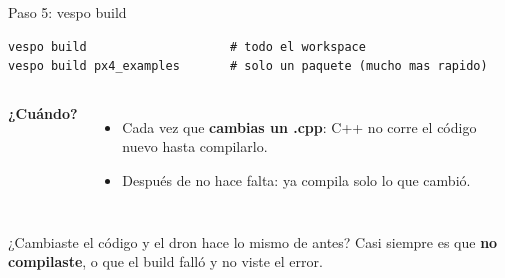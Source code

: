 \begin{frame}[fragile]{Paso 5: vespo build}
  \begin{lstlisting}[style=bash]
vespo build                    # todo el workspace
vespo build px4_examples       # solo un paquete (mucho mas rapido)
  \end{lstlisting}
  \begin{columns}[c]
    \centering
    \small
    \textbf{¿Cuándo?}
    \begin{itemize}
      \item Cada vez que \textbf{cambias un .cpp}: C++ no corre el código nuevo hasta compilarlo.
      \item Después de  no hace falta: ya compila solo lo que cambió.
    \end{itemize}
  \end{columns}
  \begin{ojo}
    \small ¿Cambiaste el código y el dron hace lo mismo de antes? Casi siempre es que \textbf{no compilaste}, o
    que el build falló y no viste el error.
  \end{ojo}
\end{frame}

